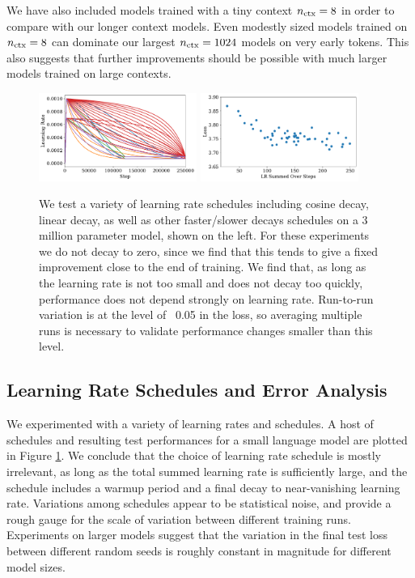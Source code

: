 \documentclass[english]{article}
\begin{document}
We have also included models trained with a tiny context $n_{\rm ctx} = 8$ in order  to compare with our longer context models.  Even modestly sized models trained on $n_{\rm ctx} = 8$ can dominate our largest $n_{\rm ctx} = 1024$ models on very early tokens.  This also suggests that further improvements should be possible with much larger models trained on large contexts.

\begin{figure}
\noindent \centering{} 
\includegraphics[width=0.46\textwidth]{VariousLearningSchedules} 
\includegraphics[width=0.46\textwidth]{LearningRateSchedulesvsPerformance} 
 \caption[Learning rate schedule scan]{
 We test a variety of learning rate schedules including cosine decay, linear decay, as well as other faster/slower decays schedules on a 3 million parameter model, shown on the left.
 For these experiments we do not decay to zero, since we find that this tends to give a fixed improvement close to the end of training.
 We find that, as long as the learning rate is not too small and does not decay too quickly, performance does not depend strongly on learning rate.
 Run-to-run variation is at the level of ~0.05 in the loss, so averaging multiple runs is necessary to validate performance changes smaller than this level.
 \label{fig:LearningRateSchedules} }
\end{figure}

\subsection{Learning Rate Schedules and Error Analysis}
\label{app:OptimizationDetailsandErrorAnalysis}

We experimented with a variety of learning rates and schedules.  A host of schedules and resulting test performances for a small language model are plotted in Figure \ref{fig:LearningRateSchedules}. We conclude that the choice of learning rate schedule is mostly irrelevant, as long as the total summed learning rate is sufficiently large, and the schedule includes a warmup period and a final decay to near-vanishing learning rate.  Variations among schedules appear to be statistical noise, and provide a rough gauge for the scale of variation between different training runs.  Experiments on larger models suggest that the variation in the final test loss between different random seeds is roughly constant in magnitude for different model sizes.
\end{document}
